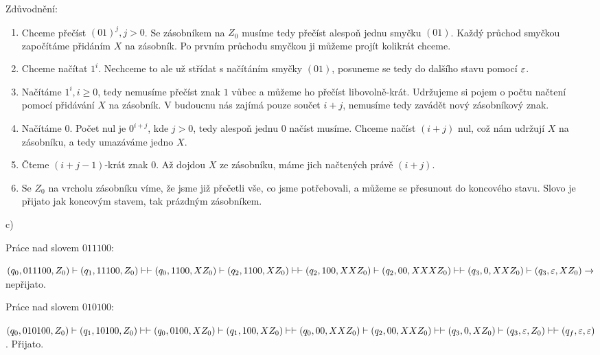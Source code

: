 Zdůvodnění: 
\begin{enumerate}[noitemsep]
    \item Chceme přečíst $(01)^j, j > 0$. Se zásobníkem na $Z_0$ musíme tedy přečíst alespoň jednu smyčku $(01)$. 
    Každý průchod smyčkou započítáme přidáním $X$ na zásobník. Po prvním průchodu smyčkou ji můžeme projít kolikrát chceme. 
    \item Chceme načítat $1^i$. Nechceme to ale už střídat s načítáním smyčky $(01)$, posuneme se tedy do dalšího 
    stavu pomocí $\varepsilon$. 
    \item Načítáme $1^i, i \geq 0$, tedy nemusíme přečíst znak $1$ vůbec a můžeme ho přečíst libovolně-krát. Udržujeme 
    si pojem o počtu načtení pomocí přidávání $X$ na zásobník. V budoucnu nás zajímá pouze součet $i+j$, nemusíme tedy 
    zavádět nový zásobníkový znak. 
    \item Načítáme $0$. Počet nul je $0^{i+j}$, kde $j > 0$, tedy alespoň jednu $0$ načíst musíme. Chceme načíst 
    $(i+j)$ nul, což nám udržují $X$ na zásobníku, a tedy umazáváme jedno $X$. 
    \item Čteme $(i + j - 1)$-krát znak $0$. Až dojdou $X$ ze zásobníku, máme jich načtených právě $(i+j)$. 
    \item Se $Z_0$ na vrcholu zásobníku víme, že jsme již přečetli vše, co jsme potřebovali, a můžeme se přesunout do 
    koncového stavu. Slovo je přijato jak koncovým stavem, tak prázdným zásobníkem. 
\end{enumerate}

c) 

\begin{multicols}{2} 

    Práce nad slovem $011100$: 

    $
    {(q_0, 011100, Z_0) \vdash (q_1, 11100, Z_0) \vdash }\\
    {\vdash (q_0, 1100, XZ_0) \vdash (q_2, 1100, XZ_0) \vdash }\\
    {\vdash (q_2, 100, XXZ_0) \vdash (q_2, 00, XXXZ_0) \vdash }\\ 
    {\vdash (q_3, 0, XXZ_0) \vdash (q_3, \varepsilon, XZ_0) }\\
    \to $
    nepřijato. 

    Práce nad slovem $010100$: 

    $
    {(q_0, 010100, Z_0) \vdash (q_1, 10100, Z_0) \vdash }\\
    {\vdash (q_0, 0100, XZ_0) \vdash (q_1, 100, XZ_0) \vdash }\\
    {\vdash (q_0, 00, XXZ_0) \vdash (q_2, 00, XXZ_0) \vdash }\\
    {\vdash (q_3, 0, XZ_0) \vdash (q_3, \varepsilon, Z_0) \vdash }\\
    {\vdash (q_f, \varepsilon, \varepsilon)}
    $. Přijato. 

\end{multicols}

